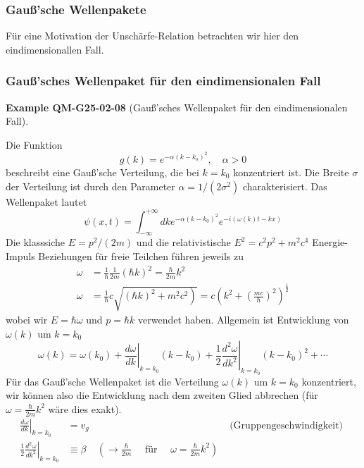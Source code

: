 \documentclass[10pt, letterpaper]{article}
\newcommand{\CustomHeading}[3]{%
  \par\medskip\noindent%
  \textbf{#1 #2} \textnormal{(#3)}.\enskip%
}
\newenvironment{EXA}[2]{\begin{unitbox}\CustomHeading{Example}{#1}{#2}}{\end{unitbox}}
\begin{document}
\subsubsection*{Gauß'sche Wellenpakete}


Für eine Motivation der Unschärfe-Relation betrachten wir hier den eindimensionallen Fall.



\subsubsection*{Gauß'sches Wellenpaket für den eindimensionalen Fall}


\begin{EXA}{QM-G25-02-08}{Gauß'sches Wellenpaket für den eindimensionalen Fall}
Die Funktion
$$
g(k)=e^{-\alpha\left(k-k_{o}\right)^{2}}, \quad \alpha>0
$$
beschreibt eine Gauß'sche Verteilung, die bei $k=k_{0}$ konzentriert ist. Die Breite $\sigma$ der Verteilung ist durch den Parameter $\alpha=1 /\left(2 \sigma^{2}\right)$ charakterisiert. Das Wellenpaket lautet
$$
\psi(x, t)=\int_{-\infty}^{+\infty} d k e^{-\alpha\left(k-k_{0}\right)^{2}} e^{-i(\omega(k) t-k x)}
$$
Die klasssiche $E=p^{2} /(2 m)$ und die relativistische $E^{2}=c^{2} p^{2}+m^{2} c^{4}$ Energie-Impuls Beziehungen für freie Teilchen führen jeweils zu
$$
\begin{aligned}
\omega & =\frac{1}{\hbar} \frac{1}{2 m}(\hbar k)^{2}=\frac{\hbar}{2 m} k^{2} \\
\omega & =\frac{1}{\hbar} c \sqrt{\left.(\hbar k)^{2}+m^{2} c^{2}\right)}=c\left(k^{2}+\left(\frac{m c}{\hbar}\right)^{2}\right)^{\frac{1}{2}}
\end{aligned}
$$
wobei wir $E=\hbar \omega$ und $p=\hbar k$ verwendet haben. Allgemein ist Entwicklung von $\omega(k)$ um $k=k_{0}$
$$
\omega(k)=\omega\left(k_{0}\right)+\left.\frac{d \omega}{d k}\right|_{k=k_{0}}\left(k-k_{0}\right)+\left.\frac{1}{2} \frac{d^{2} \omega}{d k^{2}}\right|_{k=k_{0}}\left(k-k_{0}\right)^{2}+\cdots
$$
Für das Gauß'sche Wellenpaket ist die Verteilung $\omega(k)$ um $k=k_{0}$ konzentriert, wir können also die Entwicklung nach dem zweiten Glied abbrechen (für $\omega=\frac{\hbar}{2 m} k^{2}$ wäre dies exakt).
$$
\begin{array}{rlrl}
\left.\frac{d \omega}{d k}\right|_{k=k_{0}} & =v_{g} & & \text { (Gruppengeschwindigkeit) } \\
\left.\frac{1}{2} \frac{d^{2} \omega}{d k^{2}}\right|_{k=k_{0}} & \equiv \beta & \left(\rightarrow \frac{\hbar}{2 m} \quad \text { für } \quad \omega=\frac{\hbar}{2 m} k^{2}\right)

\end{array}$$
\end{EXA}
\end{document}
